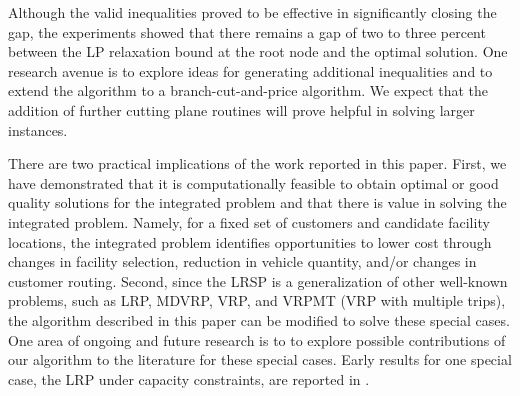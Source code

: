 \documentclass[11pt]{article}
\newcommand{\Home}{/home/ted}
\newcommand{\Bibdir}{\Home/Ref/GroupReferences/BibFiles}
\begin{document}
Although the valid inequalities proved to be effective in significantly closing
the gap, the experiments showed that there remains a gap of two to three percent
between the LP relaxation bound at the root node and the optimal solution.  One research
avenue is to explore ideas for generating additional inequalities and to extend the
algorithm to a branch-cut-and-price algorithm.  We expect that the addition of further
cutting plane routines will prove helpful in solving larger instances.

There are two practical implications of the work reported in this paper. First,
we have demonstrated that it is computationally feasible to obtain optimal or 
good quality solutions for the integrated problem and that there is value in
solving the integrated problem.  Namely, for a fixed set of customers and
candidate facility locations, the integrated problem identifies opportunities
to lower cost through changes in facility selection, reduction in vehicle quantity,
and/or changes in customer routing.  Second, 
since the LRSP is a generalization of other well-known problems, such as 
LRP, MDVRP, VRP, and VRPMT (VRP with multiple trips), the algorithm described in 
this paper can be  modified to solve these special cases.
One area of ongoing and future research is to  
to explore possible contributions of our algorithm to the literature for these 
special cases.  Early results for one special case, 
the LRP under capacity constraints, are reported in
\citet{Akca3}. 


 



%
%
%


%
%
\newpage
%


%
\end{document}
